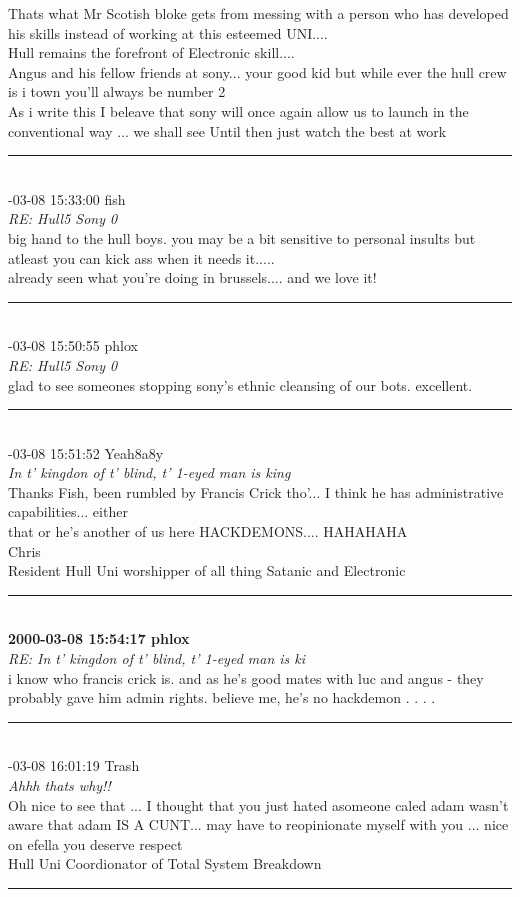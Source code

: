 \begin{mail}
Thats what Mr Scotish bloke gets from messing with a person who has developed his skills instead of working at this esteemed UNI....\\
Hull remains the forefront of Electronic skill....\\
Angus and his fellow friends at sony... your good kid but while ever the hull crew is i  town you'll always be number 2\\
As i write this I beleave that sony will once again allow us to launch in the conventional way ... we shall see 
Until then just watch the best at work\\
\rule{0.8\textwidth}{.4pt}\\
{-03-08 15:33:00 fish}\\
{\itshape RE: Hull5 Sony 0}\\
big hand to the hull boys.
you may be a bit sensitive to personal insults but atleast you can kick ass when it needs it.....\\
already seen what you're doing in brussels.... and we love it!\\
\rule{0.8\textwidth}{.4pt}\\
{-03-08 15:50:55 phlox}\\
{\itshape RE: Hull5 Sony 0}\\
glad to see someones stopping sony's ethnic cleansing of our bots. excellent.\\
\rule{0.8\textwidth}{.4pt}\\
{-03-08 15:51:52 Yeah8a8y}\\
{\itshape In t' kingdon of t' blind, t' 1-eyed man is king}\\
Thanks Fish, been rumbled by Francis Crick tho'... I think he has administrative capabilities... either \\
that or he's another of us here HACKDEMONS.... HAHAHAHA\\
Chris\\
Resident Hull Uni worshipper of all thing Satanic and Electronic\\
\rule{0.8\textwidth}{.4pt}\\
{\bf2000-03-08 15:54:17	phlox}\\
{\itshape RE: In t' kingdon of t' blind, t' 1-eyed man is ki}\\
i know who francis crick is. and as he's good mates with luc and angus - they probably gave him admin rights. believe me, he's no hackdemon . . . .	\\
\rule{0.8\textwidth}{.4pt}\\
{-03-08 16:01:19 Trash}\\
{\itshape Ahhh thats why!!}\\
Oh nice to see that ...  I thought that you just hated asomeone caled adam wasn't aware that adam IS A CUNT... 
may have to reopinionate myself with you ...  nice on efella you deserve respect \\
Hull Uni Coordionator of Total System Breakdown\\
\rule{0.8\textwidth}{.4pt}
\end{mail}

